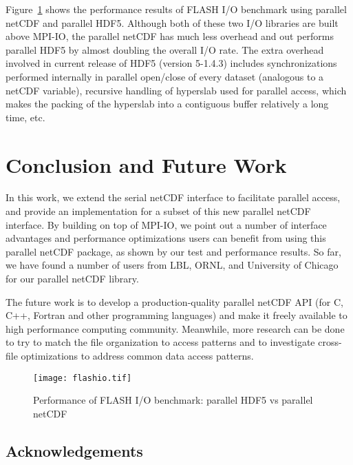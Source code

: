 \documentclass[10pt,twocolumn]{article}          %
\begin{document}
Figure~\ref{figure:flashio} shows the performance results of FLASH
I/O benchmark using parallel netCDF and parallel HDF5. Although
both of these two I/O libraries are built above MPI-IO, the
parallel netCDF has much less overhead and out performs parallel
HDF5 by almost doubling the overall I/O rate. The extra overhead
involved in current release of HDF5 (version 5-1.4.3) includes
synchronizations performed internally in parallel open/close of
every dataset (analogous to a netCDF variable), recursive handling
of hyperslab used for parallel access, which makes the packing of
the hyperslab into a contiguous buffer relatively a long time,
etc.

\section{Conclusion and Future Work}

In this work, we extend the serial netCDF interface to facilitate parallel access, and provide an
implementation for a subset of this new parallel netCDF interface. By building on top of MPI-IO, we
point out a number of interface advantages and performance optimizations users can benefit from
using this parallel netCDF package, as shown by our test and performance results. So far, we have
found a number of users from LBL, ORNL, and University of Chicago for our parallel netCDF library.

The future work is to develop a production-quality parallel netCDF API (for C, C++, Fortran and
other programming languages) and make it freely available to high performance computing community.
Meanwhile, more research can be done to try to match the file organization to access patterns and
to investigate cross-file optimizations to address common data access patterns.

\begin{figure}
\begin{center}
\texttt{[image: flashio.tif]}
\end{center}
\vskip -0.1in \caption{Performance of FLASH I/O benchmark:
parallel HDF5 vs parallel netCDF} \label{figure:flashio}
\end{figure}

\subsection*{Acknowledgements}
\end{document}
